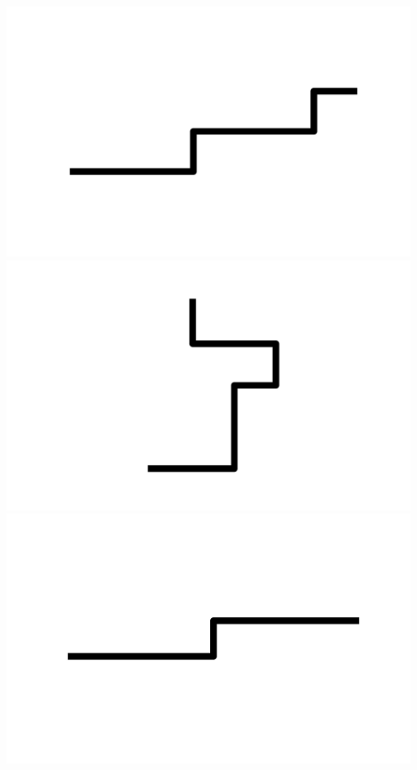 \documentclass[]{report}
\begin{document}
\includegraphics[scale=.1]{pictures/21/state_cluster_shapes_211.pdf} 
\includegraphics[scale=.1]{pictures/21/state_cluster_shapes_212.pdf} 
\includegraphics[scale=.1]{pictures/21/state_cluster_shapes_213.pdf} 
\end{document}
